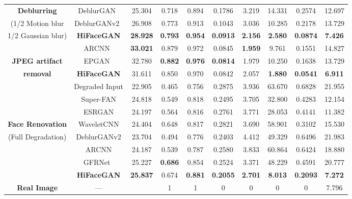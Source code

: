 \documentclass[sigconf]{acmart}
\begin{document}
\begin{table*}[!pt]
{\begin{tabular}{|c|c|ccc|cc|ccc|}
			\textbf{Deblurring} & DeblurGAN~\cite{DeblurGAN} & 25.304 & 0.718 & 0.894 & 0.1786 & 3.219 & 14.331 & 0.2574 & 12.697 \\
			(1/2 Motion blur& DeblurGANv2~\cite{DeblurGANv2} & 26.908 & 0.773 & 0.913 & 0.1043 & 3.036 & 10.285 & 0.2178 & 13.729 \\
			1/2 Gaussian blur)& \textbf{HiFaceGAN} & \textbf{28.928} & \textbf{0.793} & \textbf{0.954} & \textbf{0.0913} & \textbf{2.156} & \textbf{2.580} & \textbf{0.0874} & \textbf{7.426} \\
			\hline\hline
			
			& ARCNN~\cite{ARCNN} & \textbf{33.021} & 0.879 & 0.972 & 0.0845 & \textbf{1.959} & 9.761 & 0.1551 & 14.827 \\
			\textbf{JPEG artifact} & EPGAN~\cite{EPGAN} & 32.780 & \textbf{0.882} & \textbf{0.976} & \textbf{0.0814} & 1.979 & 10.250 & 0.1638 & 13.729 \\
			\textbf{removal} & \textbf{HiFaceGAN} & 31.611 & 0.850 & 0.970 & 0.0842 & 2.057& \textbf{1.880} & \textbf{0.0541} & \textbf{6.911} \\
			\hline\hline
			
			& Degraded Input & 22.905 & 0.465 & 0.756 & 0.2875 & 3.936 & 63.670 & 0.6828 & 21.955 \\
			& Super-FAN & 24.818 & 0.549 & 0.818 & 0.2495 & 3.705 & 32.800 & 0.4283 & 12.154 \\
			& ESRGAN & 24.197 & 0.564 & 0.816 & 0.2761 & 3.771 & 28.053 & 0.4141 & 11.382 \\
			\textbf{Face Renovation} & WaveletCNN & 24.404 & 0.648 & 0.817 & 0.2821 & 3.690 & 58.901 & 0.3102 & 15.530 \\
			(Full Degradation) & DeblurGANv2 & 23.704 & 0.494 & 0.776 & 0.2403 & 4.412 & 49.329 & 0.6496 & 21.983 \\
			& ARCNN & 24.187 & 0.539 & 0.787 & 0.2580 & 3.833 & 60.864 & 0.6424 & 18.880 \\
			& GFRNet~\cite{BlindFR-ECCV2018} & 25.227 & \textbf{0.686} & 0.854 & 0.2524 & 3.371 & 48.229 & 0.4591 & 20.777 \\
			& \textbf{HiFaceGAN} & \textbf{25.837} & 0.674 & \textbf{0.881} & \textbf{0.2055} & \textbf{2.701} & \textbf{8.013} & \textbf{0.2093} &\textbf{7.272} \\
			\hline\hline
			
			\textbf{Real Image} & --- &  & 1 & 1 & 0 & 0& 0 & 0 & 7.796 \\
			\hline
			
		\end{tabular}
	}
\end{table*}
\end{document}
